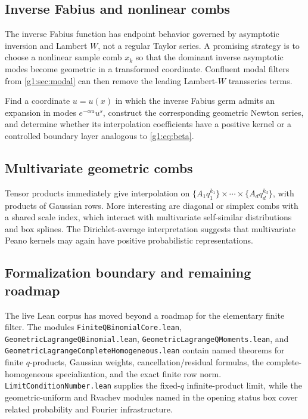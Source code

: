\subsection{Inverse Fabius and nonlinear combs}

The inverse Fabius function has endpoint behavior governed by asymptotic
inversion and Lambert $W$, not a regular Taylor series.  A promising strategy is
to choose a nonlinear sample comb $x_k$ so that the dominant inverse asymptotic
modes become geometric in a transformed coordinate.  Confluent modal filters
from \cref{g1:sec:modal} can then remove the leading Lambert-$W$ transseries terms.

\begin{problem}
Find a coordinate $u=u(x)$ in which the inverse Fabius germ admits an expansion
in modes $e^{-\alpha u}u^s$, construct the corresponding geometric Newton
series, and determine whether its interpolation coefficients have a positive
kernel or a controlled boundary layer analogous to \eqref{g1:eq:beta}.
\end{problem}

\subsection{Multivariate geometric combs}

Tensor products immediately give interpolation on
$\{A_1q_1^{k_1}\}\times\cdots\times\{A_dq_d^{k_d}\}$, with products of
Gaussian rows.  More interesting are diagonal or simplex combs with a shared
scale index, which interact with multivariate self-similar distributions and
box splines.  The Dirichlet-average interpretation suggests that multivariate
Peano kernels may again have positive probabilistic representations.

\subsection{Formalization boundary and remaining roadmap}

The live Lean corpus has moved beyond a roadmap for the elementary finite
filter.  The modules \nolinkurl{FiniteQBinomialCore.lean},
\nolinkurl{GeometricLagrangeQBinomial.lean},
\nolinkurl{GeometricLagrangeQMoments.lean}, and
\nolinkurl{GeometricLagrangeCompleteHomogeneous.lean} contain named theorems
for finite $q$-products, Gaussian weights, cancellation/residual formulas, the
complete-homogeneous specialization, and the exact finite row norm.
\nolinkurl{LimitConditionNumber.lean} supplies the fixed-$q$ infinite-product
limit, while the geometric-uniform and Rvachev modules named in the opening
status box cover related probability and Fourier infrastructure.

